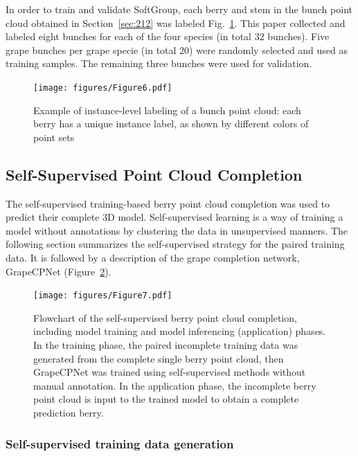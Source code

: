 \documentclass[12pt]{article}
\begin{document}
In order to train and validate SoftGroup, each berry and stem in the bunch point cloud obtained in Section~\ref{sec:212} was  labeled  Fig.~\ref{fig:raw11}. 
This paper collected and labeled eight bunches for each of the four species (in total 32 bunches). 
Five grape bunches per grape specie (in total 20) were randomly selected and used as training samples. The remaining three bunches were used for validation.

\begin{figure}[hbt!]
    \centering
    \texttt{[image: figures/Figure6.pdf]}
    \caption{Example of instance-level labeling of a bunch point cloud: each berry has a unique instance label, as shown by different colors of point sets}
    \label{fig:raw11}
\end{figure}

\subsection{Self-Supervised Point Cloud Completion}

The self-supervised training-based berry point cloud completion was used to predict their complete 3D model. 
Self-supervised learning is a way of training a model without annotations by clustering the data in unsupervised manners. 
The following section summarizes the self-supervised strategy for the paired training data. It is followed by a description of the grape completion network, GrapeCPNet (Figure~\ref{fig:raw3}).

\begin{figure}[hbt!]
    \centering
    \texttt{[image: figures/Figure7.pdf]}
    \caption{Flowchart of the self-supervised berry point cloud completion, including model training and model inferencing (application) phases. In the training phase, the paired incomplete training data was generated from the complete single berry point cloud, then GrapeCPNet was trained using self-supervised methods without manual annotation. In the application phase, the incomplete berry point cloud is input to the trained model to obtain a complete prediction berry.}
    \label{fig:raw3}
\end{figure}

\subsubsection{Self-supervised training data generation}
\label{sec:berrycut}
\end{document}
